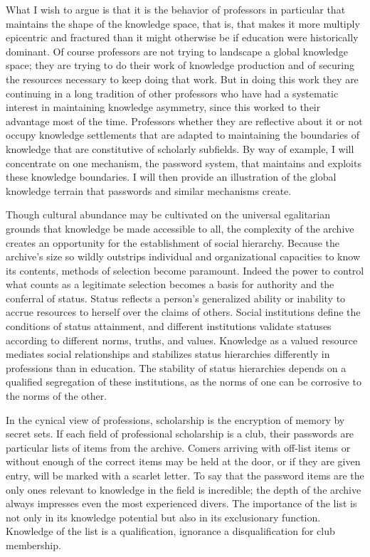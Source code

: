 \documentclass[]{book}
\theoremstyle{definition}
\theoremstyle{definition}
\theoremstyle{definition}
\theoremstyle{remark}
\begin{document}
What I wish to argue is that it is the behavior of professors in
particular that maintains the shape of the knowledge space, that is,
that makes it more multiply epicentric and fractured than it might
otherwise be if education were historically dominant. Of course
professors are not trying to landscape a global knowledge space; they
are trying to do their work of knowledge production and of securing the
resources necessary to keep doing that work. But in doing this work they
are continuing in a long tradition of other professors who have had a
systematic interest in maintaining knowledge asymmetry, since this
worked to their advantage most of the time. Professors whether they are
reflective about it or not occupy knowledge settlements that are adapted
to maintaining the boundaries of knowledge that are constitutive of
scholarly subfields. By way of example, I will concentrate on one
mechanism, the password system, that maintains and exploits these
knowledge boundaries. I will then provide an illustration of the global
knowledge terrain that passwords and similar mechanisms create.

Though cultural abundance may be cultivated on the universal egalitarian
grounds that knowledge be made accessible to all, the complexity of the
archive creates an opportunity for the establishment of social
hierarchy. Because the archive's size so wildly outstrips individual and
organizational capacities to know its contents, methods of selection
become paramount. Indeed the power to control what counts as a
legitimate selection becomes a basis for authority and the conferral of
status. Status reflects a person's generalized ability or inability to
accrue resources to herself over the claims of others. Social
institutions define the conditions of status attainment, and different
institutions validate statuses according to different norms, truths, and
values. Knowledge as a valued resource mediates social relationships and
stabilizes status hierarchies differently in professions than in
education. The stability of status hierarchies depends on a qualified
segregation of these institutions, as the norms of one can be corrosive
to the norms of the other.

In the cynical view of professions, scholarship is the encryption of
memory by secret sets. If each field of professional scholarship is a
club, their passwords are particular lists of items from the archive.
Comers arriving with off-list items or without enough of the correct
items may be held at the door, or if they are given entry, will be
marked with a scarlet letter. To say that the password items are the
only ones relevant to knowledge in the field is incredible; the depth of
the archive always impresses even the most experienced divers. The
importance of the list is not only in its knowledge potential but also
in its exclusionary function. Knowledge of the list is a qualification,
ignorance a disqualification for club membership.
\end{document}
